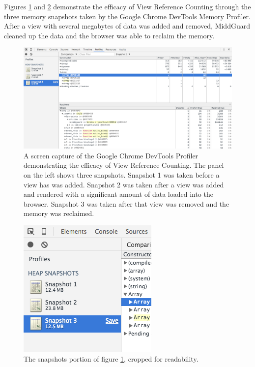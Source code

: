 \documentclass[midd]{thesis}
\begin{document}
Figures \ref{fig:vrc} and \ref{fig:vrccropped} demonstrate the efficacy of View
Reference Counting through the three memory snapshots taken by the Google Chrome
DevTools Memory Profiler. After a view with several megabytes of data was added
and removed, MiddGuard cleaned up the data and the browser was able to reclaim
the memory.

\begin{figure}[!ht]
  \centering
  \includegraphics[width=1\textwidth]{devtools-snapshot}
  \caption{A screen capture of the Google Chrome DevTools Profiler demonstrating
  the efficacy of View Reference Counting. The panel on the left shows three
  snapshots. Snapshot 1 was taken before a view has was added. Snapshot 2 was
  taken after a view was added and rendered with a significant amount of data
  loaded into the browser. Snapshot 3 was taken after that view was removed and
  the memory was reclaimed.}
  \label{fig:vrc}
\end{figure}

\begin{figure}[!ht]
  \centering
  \includegraphics{devtools-snapshot-cropped}
  \caption{The snapshots portion of figure \ref{fig:vrc}, cropped for
  readability.}
  \label{fig:vrccropped}
\end{figure}
\end{document}
